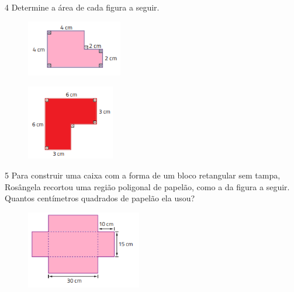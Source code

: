\num{4} Determine a área de cada figura a seguir.


\begin{escolha}[itemsep=0pt]
\item
\begin{figure}[H]
\centering\includegraphics[width=1.65in,height=0.96458in]{./imgSAEB_8_MAT/media/image43.png}
\end{figure}


\item
\begin{figure}[H]
\centering\includegraphics[width=1.50833in,height=1.28681in]{./imgSAEB_8_MAT/media/image44.png}
\end{figure}

\end{escolha}

\num{5} Para construir uma caixa com a forma de um bloco retangular sem
tampa, Rosângela recortou uma região poligonal de papelão, como a da
figura a seguir. Quantos centímetros quadrados de papelão ela usou?

\begin{figure}[H]
\centering\includegraphics[width=1.98333in,height=1.33255in]{./imgSAEB_8_MAT/media/image45.png}
\end{figure}

